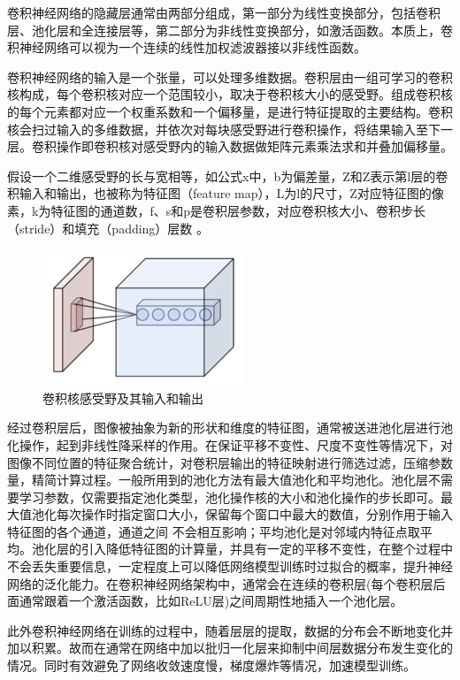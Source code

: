 卷积神经网络的隐藏层通常由两部分组成，第一部分为线性变换部分，包括卷积层、池化层和全连接层等，第二部分为非线性变换部分，如激活函数。本质上，卷积神经网络可以视为一个连续的线性加权滤波器接以非线性函数。

卷积神经网络的输入是一个张量，可以处理多维数据。卷积层由一组可学习的卷积核构成，每个卷积核对应一个范围较小，取决于卷积核大小的感受野。组成卷积核的每个元素都对应一个权重系数和一个偏移量，是进行特征提取的主要结构。卷积核会扫过输入的多维数据，并依次对每块感受野进行卷积操作，将结果输入至下一层。卷积操作即卷积核对感受野内的输入数据做矩阵元素乘法求和并叠加偏移量。

假设一个二维感受野的长与宽相等，如公式x中，b为偏差量，Z和Z表示第l层的卷积输入和输出，也被称为特征图（feature map），L为l的尺寸，Z对应特征图的像素，k为特征图的通道数，f、s和p是卷积层参数，对应卷积核大小、卷积步长（stride）和填充（padding）层数 。

\begin{figure}[h]
	\centering
	\includegraphics[scale=1.2]{figures/8.png}
	\caption{卷积核感受野及其输入和输出}
	\label{fig:f8}
\end{figure}
经过卷积层后，图像被抽象为新的形状和维度的特征图，通常被送进池化层进行池化操作，起到非线性降采样的作用。在保证平移不变性、尺度不变性等情况下，对图像不同位置的特征聚合统计，对卷积层输出的特征映射进行筛选过滤，压缩参数量，精简计算过程。一般所用到的池化方法有最大值池化和平均池化。池化层不需要学习参数，仅需要指定池化类型，池化操作核的大小和池化操作的步长即可。最大值池化每次操作时指定窗口大小，保留每个窗口中最大的数值，分别作用于输入特征图的各个通道，通道之间 不会相互影响；平均池化是对邻域内特征点取平均。池化层的引入降低特征图的计算量，并具有一定的平移不变性，在整个过程中不会丢失重要信息，一定程度上可以降低网络模型训练时过拟合的概率，提升神经网络的泛化能力。在卷积神经网络架构中，通常会在连续的卷积层(每个卷积层后面通常跟着一个激活函数，比如ReLU层)之间周期性地插入一个池化层。

此外卷积神经网络在训练的过程中，随着层层的提取，数据的分布会不断地变化并加以积累。故而在通常在网络中加以批归一化层来抑制中间层数据分布发生变化的情况。同时有效避免了网络收敛速度慢，梯度爆炸等情况，加速模型训练。


